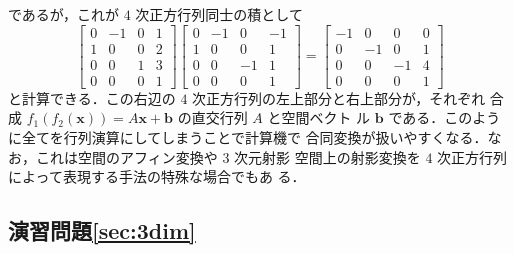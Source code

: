 \documentclass[11pt, uplatex, dvipdfmx, titlepage]{jsarticle}
\theoremstyle{definition}
\begin{document}
であるが，これが $4$ 次正方行列同士の積として
\[
  \left[
    \begin{array}{rrr|r}
      0 & -1 & 0 & 1\\
      1 & 0 & 0 & 2\\
      0 & 0 & 1 & 3\\ \hline
      0 & 0 & 0 & 1
    \end{array}
  \right] \left[
    \begin{array}{rrr|r}
      0 & -1 & 0 & -1\\
      1 & 0 & 0 & 1\\ 
      0 & 0 & -1 & 1\\ \hline
      0 & 0 & 0 & 1
    \end{array}
  \right] = \left[
    \begin{array}{rrr|r}
      -1 & 0 & 0 & 0\\
      0 & -1 & 0 & 1\\ 
      0 & 0 & -1 & 4\\ \hline
      0 & 0 & 0 & 1
    \end{array}
  \right]
\]
と計算できる．この右辺の $4$ 次正方行列の左上部分と右上部分が，それぞれ
合成 $f_1(f_2(\bm{x}))=A\bm{x} + \bm{b}$ の直交行列 $A$ と空間ベクト
ル $\bm{b}$ である．このように全てを行列演算にしてしまうことで計算機で
合同変換が扱いやすくなる．なお，これは空間のアフィン変換や $3$ 次元射影
空間上の射影変換を $4$ 次正方行列によって表現する手法の特殊な場合でもあ
る．


\newpage

\subsection*{演習問題\ref{sec:3dim}}
\end{document}
